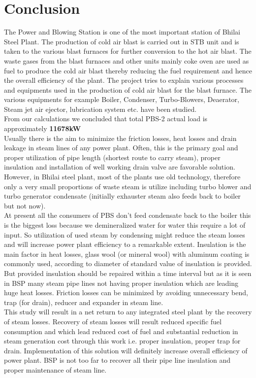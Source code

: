 \documentclass[english,11pt]{report}
\begin{document}
\chapter{Conclusion}
The Power and Blowing Station is one of the most important station of Bhilai Steel Plant. The production of cold air blast is carried out in STB unit and is taken to the various blast furnaces for further conversion to the hot air blast. The waste gases from the blast furnaces and other units mainly coke oven are used as fuel to produce the cold air blast thereby reducing the fuel requirement and hence the overall efficiency of the plant. The project tries to explain various processes and equipments used in the production of cold air blast for the blast furnace. The various equipments for example Boiler, Condenser, Turbo-Blowers, Deaerator, Steam jet air ejector, lubrication system etc. have been studied.\\
From our calculations we concluded that total PBS-2 actual load is approximately \textbf{11678kW}\\
Usually there is the aim to minimize the friction losses, heat losses and drain leakage in steam lines of any power plant. Often, this is the primary goal and proper utilization of pipe length (shortest route to carry steam), proper insulation and installation of well working drain valve are favorable solution. However, in Bhilai steel plant, most of the plants use old technology, therefore only a very small proportions of waste steam is utilize including turbo blower and turbo generator condensate (initially exhauster steam also feeds back to boiler but not now).\\
At present all the consumers of PBS don’t feed condensate back to the boiler this is the biggest loss because we demineralized water for water this require a lot of input. So utilization of used steam by condensing might reduce the steam losses and will increase power plant efficiency to a remarkable extent. Insulation is the main factor in heat losses, glass wool (or mineral wool) with aluminum coating is commonly used, according to diameter of standard value of insulation is provided. But provided insulation should be repaired within a time interval but as it is seen in BSP many steam pipe lines not having proper insulation which are leading huge heat losses. Friction losses can be minimized by avoiding unnecessary bend, trap (for drain), reducer and expander in steam line.\\
This study will result in a net return to any integrated steel plant by the recovery of steam losses. Recovery of steam losses will result reduced specific fuel consumption and which lead reduced cost of fuel and substantial reduction in steam generation cost through this work i.e. proper insulation, proper trap for drain. Implementation of this solution will definitely increase overall efficiency of power plant. BSP is not too far to recover all their pipe line insulation and proper maintenance of steam line. 
\end{document}
